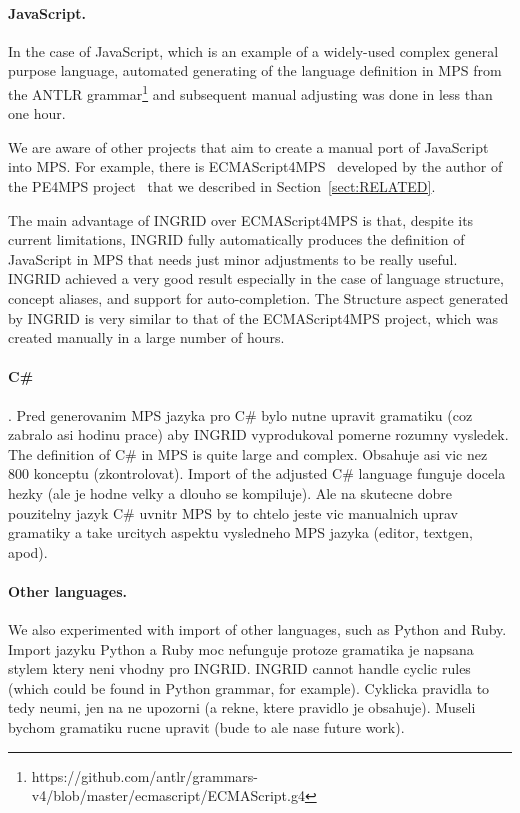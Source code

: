 \paragraph{JavaScript.}
In the case of JavaScript, which is an example of a widely-used complex general purpose language, automated generating of the language definition in MPS from the ANTLR grammar\footnote{https://github.com/antlr/grammars-v4/blob/master/ecmascript/ECMAScript.g4} and subsequent manual adjusting was done in less than one hour.

We are aware of other projects that aim to create a manual port of JavaScript into MPS.
For example, there is ECMAScript4MPS~\cite{ref:ECMA4MPS} developed by the author of the PE4MPS project~\cite{ref:PE4MPS} that we described in Section~\ref{sect:RELATED}.

The main advantage of INGRID over ECMAScript4MPS is that, despite its current limitations, INGRID fully automatically produces the definition of JavaScript in MPS that needs just minor adjustments to be really useful.
INGRID achieved a very good result especially in the case of language structure, concept aliases, and support for auto-completion.
The Structure aspect generated by INGRID is very similar to that of the ECMAScript4MPS project, which was created manually in a large number of hours.









\paragraph{C\#}.
Pred generovanim MPS jazyka pro C\# bylo nutne upravit gramatiku (coz zabralo asi hodinu prace) aby INGRID vyprodukoval pomerne rozumny vysledek.
The definition of C\# in MPS is quite large and complex.
Obsahuje asi vic nez 800 konceptu (zkontrolovat).
Import of the adjusted C\# language funguje docela hezky (ale je hodne velky a dlouho se kompiluje).
Ale na skutecne dobre pouzitelny jazyk C\# uvnitr MPS by to chtelo jeste vic manualnich uprav gramatiky a take urcitych aspektu vysledneho MPS jazyka (editor, textgen, apod).

\paragraph{Other languages.}
We also experimented with import of other languages, such as Python and Ruby.
Import jazyku Python a Ruby moc nefunguje protoze gramatika je napsana stylem ktery neni vhodny pro INGRID.
INGRID cannot handle cyclic rules (which could be found in Python grammar, for example).
Cyklicka pravidla to tedy neumi, jen na ne upozorni (a rekne, ktere pravidlo je obsahuje).
Museli bychom gramatiku rucne upravit (bude to ale nase future work).

